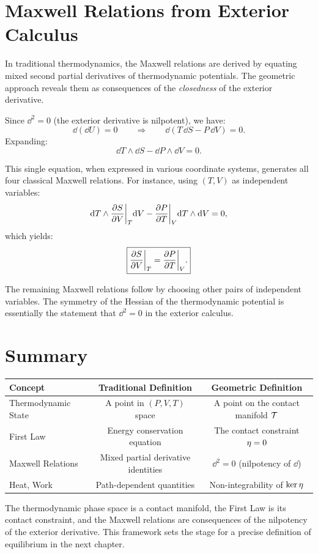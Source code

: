 \section{Maxwell Relations from Exterior Calculus}

In traditional thermodynamics, the Maxwell relations are derived by equating mixed second partial derivatives of thermodynamic potentials. The geometric approach reveals them as consequences of the \emph{closedness} of the exterior derivative.

Since $\dd^2 = 0$ (the exterior derivative is nilpotent), we have:
\begin{equation}
\dd(\dd U) = 0 \qquad \Longrightarrow \qquad \dd(T\,\dd S - P\,\dd V) = 0.
\end{equation}
Expanding:
\begin{equation}
\dd T \wedge \dd S - \dd P \wedge \dd V = 0.
\end{equation}

This single equation, when expressed in various coordinate systems, generates all four classical Maxwell relations. For instance, using $(T, V)$ as independent variables:
\begin{equation}
\dd T \wedge \pdv{S}{V}\bigg|_T \dd V - \pdv{P}{T}\bigg|_V \dd T \wedge \dd V = 0,
\end{equation}
which yields:
\begin{equation}
\boxed{\pdv{S}{V}\bigg|_T = \pdv{P}{T}\bigg|_V.}
\end{equation}

The remaining Maxwell relations follow by choosing other pairs of independent variables. The symmetry of the Hessian of the thermodynamic potential is essentially the statement that $\dd^2 = 0$ in the exterior calculus.

\section{Summary}

\begin{table}[H]
\centering
\renewcommand{\arraystretch}{1.6}
\begin{tabular}{lcc}
\toprule
\textbf{Concept} & \textbf{Traditional Definition} & \textbf{Geometric Definition} \\
\midrule
Thermodynamic State & A point in $(P,V,T)$ space & A point on the contact manifold $\mathcal{T}$ \\
First Law & Energy conservation equation & The contact constraint $\eta = 0$ \\
Maxwell Relations & Mixed partial derivative identities & $\dd^2 = 0$ (nilpotency of $\dd$) \\
Heat, Work & Path-dependent quantities & Non-integrability of $\ker\eta$ \\
\bottomrule
\end{tabular}
\end{table}

The thermodynamic phase space is a contact manifold, the First Law is its contact constraint, and the Maxwell relations are consequences of the nilpotency of the exterior derivative. This framework sets the stage for a precise definition of equilibrium in the next chapter.
